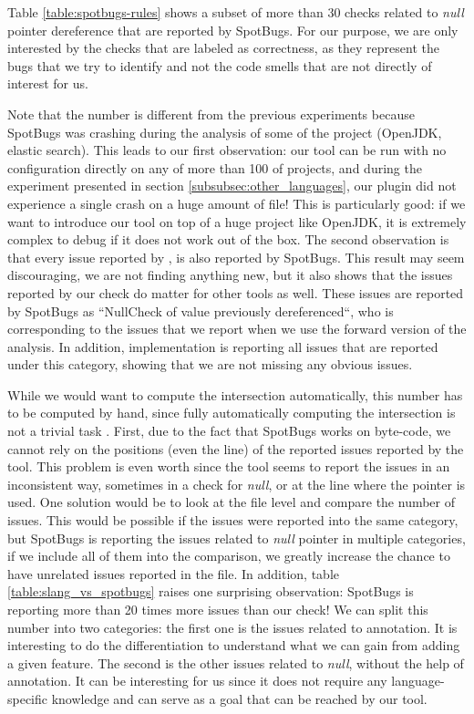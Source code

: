 Table \ref{table:spotbugs-rules} shows a subset of more than 30 checks related to \emph{null} pointer dereference that are reported by SpotBugs. 
For our purpose, we are only interested by the checks that are labeled as correctness, as they represent the bugs that we try to identify and not the code smells that are not directly of interest for us. 

Note that the number is different from the previous experiments because SpotBugs was crashing during the analysis of some of the project (OpenJDK, elastic search). 
This leads to our first observation: our tool can be run with no configuration directly on any of more than 100 of projects, and during the experiment presented in section \ref{subsubsec:other_languages}, our plugin did not experience a single crash on a huge amount of file!
This is particularly good: if we want to introduce our tool on top of a huge project like OpenJDK, it is extremely complex to debug if it does not work out of the box.
The second observation is that every issue reported by \slang{}, is also reported by SpotBugs. 
This result may seem discouraging, we are not finding anything new, but it also shows that the issues reported by our check do matter for other tools as well. 
These issues are reported by SpotBugs as “NullCheck of value previously dereferenced“, who is corresponding to the issues that we report when we use the forward version of the analysis. 
In addition, \slang{} implementation is reporting all issues that are reported under this category, showing that we are not missing any obvious issues.

While we would want to compute the intersection automatically, this number has to be computed by hand, since fully automatically computing the intersection is not a trivial task \cite{Gabel:2010:OIE:1806799.1806806}. 
First, due to the fact that SpotBugs works on byte-code, we cannot rely on the positions (even the line) of the reported issues reported by the tool. 
This problem is even worth since the tool seems to report the issues in an inconsistent way, sometimes in a check for \emph{null}, or at the line where the pointer is used. 
One solution would be to look at the file level and compare the number of issues. 
This would be possible if the issues were reported into the same category, but SpotBugs is reporting the issues related to \emph{null} pointer in multiple categories, if we include all of them into the comparison, we greatly increase the chance to have unrelated issues reported in the file. \newline
In addition, table \ref{table:slang_vs_spotbugs} raises one surprising observation: SpotBugs is reporting more than 20 times more issues than our check!
We can split this number into two categories: the first one is the issues related to annotation. 
It is interesting to do the differentiation to understand what we can gain from adding a given feature. 
The second is the other issues related to \emph{null}, without the help of annotation. 
It can be interesting for us since it does not require any language-specific knowledge and can serve as a goal that can be reached by our tool.


